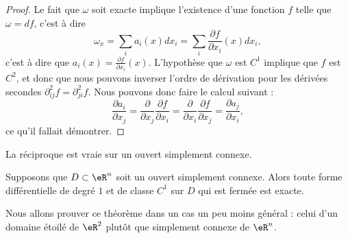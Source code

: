 \begin{proof}
	Le fait que $\omega$ soit exacte implique l'existence d'une fonction $f$ telle que $\omega=df$, c'est à dire
	\begin{equation}
		\omega_x=\sum_i a_i(x)dx_i=\sum_i\frac{ \partial f }{ \partial x_i }(x)dx_i,
	\end{equation}
	c'est à dire que $a_i(x)=\frac{ \partial f }{ \partial x_i }(x)$. L'hypothèse que $\omega$ est $C^1$ implique que $f$ est $C^2$, et donc que nous pouvons inverser l'ordre de dérivation pour les dérivées secondes $\partial^2_{ij}f=\partial^2_{ji}f$. Nous pouvons donc faire le calcul suivant :
	\begin{equation}
		\frac{ \partial a_i }{ \partial x_j }=\frac{ \partial  }{ \partial x_j }\frac{ \partial f }{ \partial x_i }=\frac{ \partial  }{ \partial x_i }\frac{ \partial f }{ \partial x_j }=\frac{ \partial a_j }{ \partial x_i },
	\end{equation}
	ce qu'il fallait démontrer.
\end{proof}

La réciproque est vraie sur un ouvert simplement connexe.
\begin{theorem}        \label{ThoFermeExactFormRappel}
Supposons que $D\subset\eR^n$ soit un ouvert simplement connexe. Alors toute forme différentielle de degré $1$ et de classe $C^1$ sur $D$ qui est fermée est exacte.
\end{theorem}

Nous allons prouver ce théorème dans un cas un peu moins général : celui d'un domaine étoilé de \( \eR^2\) plutôt que simplement connexe de \( \eR^n\).

